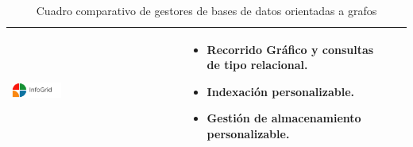 \begin{table}[b!]
\begin{tabular}{|p{2cm}|ll}
		\hline
		\multicolumn{1}{|p{3cm}|}{\includegraphics[width=0.3\textwidth]{images/InfoGrid}}      &   
		\multicolumn{1}{p{10cm}|}{
		\begin{itemize}
		\vspace{-10mm}
		\item Recorrido Gráfico y consultas de tipo relacional.
		\item Indexación personalizable.
		\item Gestión de almacenamiento personalizable.\cite{33}
		\end{itemize}}\\ 
		\hline
	\end{tabular}
	\caption{Cuadro comparativo de gestores de bases de datos orientadas a grafos}
	\label{table:bd orientadas a grafos}
\end{table}

